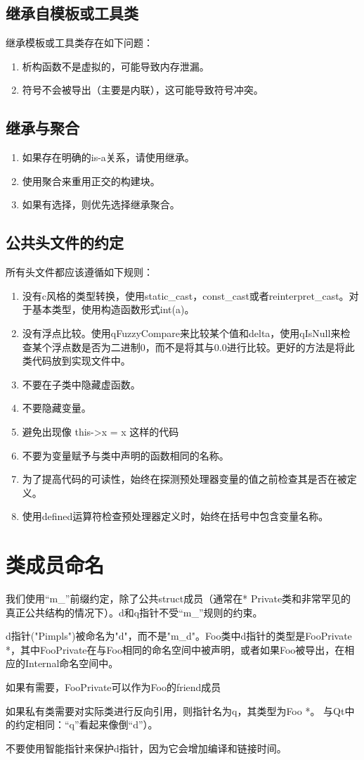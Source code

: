 \subsection{继承自模板或工具类}
继承模板或工具类存在如下问题：
\begin{enumerate}
	\item 析构函数不是虚拟的，可能导致内存泄漏。
	\item 符号不会被导出（主要是内联），这可能导致符号冲突。
\end{enumerate}
\subsection{继承与聚合}
\begin{enumerate}
	\item 如果存在明确的is-a关系，请使用继承。
	\item 使用聚合来重用正交的构建块。
	\item 如果有选择，则优先选择继承聚合。
\end{enumerate}
\subsection{公共头文件的约定}
所有头文件都应该遵循如下规则：
\begin{enumerate}
	\item 没有c风格的类型转换，使用static\_cast，const\_cast或者reinterpret\_cast。对于基本类型，使用构造函数形式int(a)。
	\item 没有浮点比较。使用qFuzzyCompare来比较某个值和delta，使用qIsNull来检查某个浮点数是否为二进制0，而不是将其与0.0进行比较。更好的方法是将此类代码放到实现文件中。
	\item 不要在子类中隐藏虚函数。
	\item 不要隐藏变量。
	\item 避免出现像 this->x = x 这样的代码
	\item 不要为变量赋予与类中声明的函数相同的名称。
	\item 为了提高代码的可读性，始终在探测预处理器变量的值之前检查其是否在被定义。
	\item 使用defined运算符检查预处理器定义时，始终在括号中包含变量名称。
\end{enumerate}
\section{类成员命名}
我们使用“m\_”前缀约定，除了公共struct成员（通常在* Private类和非常罕见的真正公共结构的情况下）。d和q指针不受“m\_”规则的约束。

d指针("Pimpls")被命名为"d"，而不是"m\_d"。Foo类中d指针的类型是FooPrivate *，其中FooPrivate在与Foo相同的命名空间中被声明，或者如果Foo被导出，在相应的Internal命名空间中。

如果有需要，FooPrivate可以作为Foo的friend成员

如果私有类需要对实际类进行反向引用，则指针名为q，其类型为Foo *。 与Qt中的约定相同：“q”看起来像倒“d”）。

不要使用智能指针来保护d指针，因为它会增加编译和链接时间。